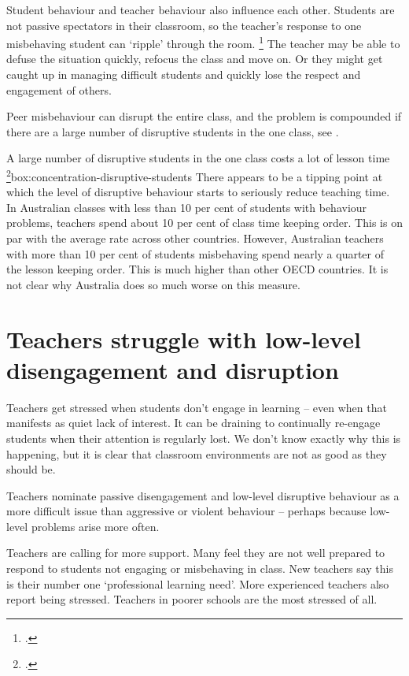\documentclass{grattan}
\begin{document}
Student behaviour and teacher behaviour also influence each other. Students are not passive spectators in their classroom, so the teacher's response to one misbehaving student can `ripple' through the room.%
\footcite{Kounin1958RippleEffectDiscipline}
The teacher may be able to defuse the situation quickly, refocus the class and move on. Or they might get caught up in managing difficult students and quickly lose the respect and engagement of others.

Peer misbehaviour can disrupt the entire class, and the problem is compounded if there are a large number of disruptive students in the one class, see .

\vfill
\begin{smallbox}{A large number of disruptive students in the one class costs a lot of lesson time%
\footcite[][Table 6.7]{Freeman2014AustralianTeachersLearning}}{box:concentration-disruptive-students}
There appears to be a tipping point at which the level of disruptive behaviour starts to seriously reduce teaching time. In Australian classes with less than 10 per cent of students with behaviour problems, teachers spend about 10 per cent of class time keeping order. This is on par with the average rate across other countries. However, Australian teachers with more than 10 per cent of students misbehaving spend nearly a quarter of the lesson keeping order. This is much higher than other OECD countries. It is not clear why Australia does so much worse on this measure.
\end{smallbox}


\chapter{Teachers struggle with low-level disengagement and disruption }\label{chap:teachers-struggle}
Teachers get stressed when students don't engage in learning -- even when that manifests as quiet lack of interest. It can be draining to continually re-engage students when their attention is regularly lost. We don't know exactly why this is happening, but it is clear that classroom environments are not as good as they should be.

Teachers nominate passive disengagement and low-level disruptive behaviour as a more difficult issue than aggressive or violent behaviour -- perhaps because low-level problems arise more often.

Teachers are calling for more support. Many feel they are not well prepared to respond to students not engaging or misbehaving in class. New teachers say this is their number one `professional learning need'. More experienced teachers also report being stressed. Teachers in poorer schools are the most stressed of all.
\end{document}
